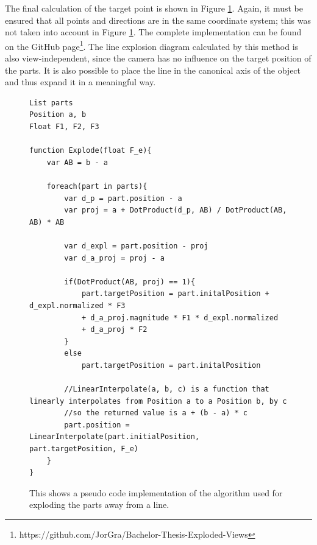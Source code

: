 The final calculation of the target point is shown in Figure \ref{fig:LineexplosionCode}.
Again, it must be ensured that all points and directions are in the same coordinate system; this was not taken into account in Figure \ref{fig:LineexplosionCode}. The complete implementation can be found on the GitHub page\footnote{https://github.com/JorGra/Bachelor-Thesis-Exploded-Views}.
The line explosion diagram calculated by this method is also view-independent, since the camera has no influence on the target position of the parts.  
It is also possible to place the line in the canonical axis of the object and thus expand it in a meaningful way.  
\begin{figure}[ht]
	\begin{lstlisting}
List parts
Position a, b
Float F1, F2, F3

function Explode(float F_e){
	var AB = b - a
	
	foreach(part in parts){
		var d_p = part.position - a
		var proj = a + DotProduct(d_p, AB) / DotProduct(AB, AB) * AB
		
		var d_expl = part.position - proj
		var d_a_proj = proj - a
		
		if(DotProduct(AB, proj) == 1){
			part.targetPosition = part.initalPosition + d_expl.normalized * F3
			+ d_a_proj.magnitude * F1 * d_expl.normalized
			+ d_a_proj * F2
		}
		else
			part.targetPosition = part.initalPosition
		
		//LinearInterpolate(a, b, c) is a function that linearly interpolates from Position a to a Position b, by c
		//so the returned value is a + (b - a) * c
		part.position = LinearInterpolate(part.initialPosition, part.targetPosition, F_e)
	}
}
	\end{lstlisting}
	\caption{This shows a pseudo code implementation of the algorithm used for exploding the parts away from a line.}
	\label{fig:LineexplosionCode}
\end{figure}


